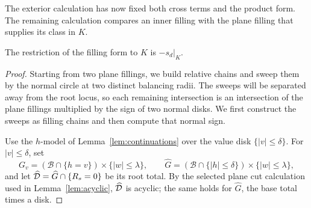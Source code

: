 The exterior calculation has now fixed both cross terms and the
product form. The remaining calculation compares an inner filling
with the plane filling that supplies its class in \(K\).

\begin{lemma}\label{lem:inner}
The restriction of the filling form to
\(K\) is \(-s_d|_K\).
\end{lemma}
\begin{proof}
Starting from two plane fillings, we build relative chains and sweep
them by the normal circle at two distinct balancing radii.
The sweeps will be separated away from the root
locus, so each remaining intersection is an intersection of the
plane fillings multiplied by the sign of two normal disks.
We first construct the sweeps as filling chains and then compute
that normal sign.

Use the \(h\)-model of Lemma~\ref{lem:continuations} over the value disk
\(\{|v|\le\delta\}\). For \(|v|\le\delta\), set
\[
G_v=(\mathcal B\cap\{h=v\})\times\{|w|\le\lambda\},\qquad
\widehat G=(\mathcal B\cap\{|h|\le\delta\})\times\{|w|\le\lambda\},
\]
and let \(\widehat{\mathcal D}=\widehat G\cap\{R_s=0\}\) be its root total.
By the selected plane cut calculation used in
Lemma~\ref{lem:acyclic}, \(\widehat{\mathcal D}\) is acyclic; the same holds
for \(\widehat G\), the base total times a disk.


\end{proof}
